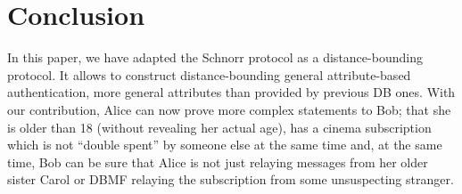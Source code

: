 \section{Conclusion}%
\label{Conclusion}

In this paper, we have adapted the Schnorr protocol as a
distance-bounding protocol.  It allows to construct distance-bounding
general attribute-based authentication, more general attributes than
provided by previous \ac{DB} ones.  With our contribution, Alice can
now prove more complex statements to Bob; \eg that she is older than 18 
(without revealing her actual age), has a cinema subscription which is not 
\enquote{double spent} by someone else at the same time and, at the same time, 
Bob can be sure that Alice is not just relaying messages from her older sister 
Carol or \ac{DBMF} relaying the subscription from some unsuspecting stranger.

